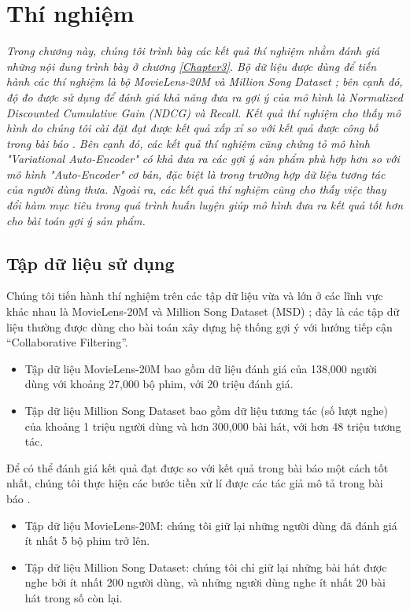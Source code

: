 \chapter{Thí nghiệm}

\setlength{\parindent}{6.5ex}
\label{Chapter4}
\graphicspath{{Chapter4/Chapter4Figs}}
\textit{Trong chương này, chúng tôi trình bày các kết quả thí nghiệm nhằm đánh giá những nội dung trình bày ở chương \ref{Chapter3}. Bộ dữ liệu được dùng để tiến hành các thí nghiệm là bộ MovieLens-20M \cite{Ml20M} và Million Song Dataset \cite{MSD}; bên cạnh đó, độ đo được sử dụng để đánh giá khả năng đưa ra gợi ý của mô hình là Normalized Discounted Cumulative Gain (NDCG) và  Recall. Kết quả thí nghiệm cho thấy mô hình do chúng tôi cài đặt đạt được kết quả xấp xỉ so với kết quả được công bố trong bài báo \cite{mvae}. Bên cạnh đó, các kết quả thí nghiệm cũng chứng tỏ mô hình "Variational Auto-Encoder" có khả đưa ra các gợi ý sản phẩm phù hợp hơn so với mô hình "Auto-Encoder" cơ bản, đặc biệt là trong trường hợp dữ liệu tương tác của người dùng thưa. Ngoài ra, các kết quả thí nghiệm cũng cho thấy việc thay đổi hàm mục tiêu trong quá trình huấn luyện giúp mô hình đưa ra kết quả tốt hơn cho bài toán gợi ý sản phẩm.}


\section{Tập dữ liệu sử dụng}
\label{chap4sec1}
Chúng tôi tiến hành thí nghiệm trên các tập dữ liệu vừa và lớn ở các lĩnh vực khác nhau là MovieLens-20M \cite{Ml20M} 
và Million Song Dataset (MSD) \cite{MSD}; đây là các tập dữ liệu thường được dùng cho bài toán xây dựng hệ thống gợi ý
với hướng tiếp cận ``Collaborative Filtering''. 
\begin{itemize}
    \item Tập dữ liệu MovieLens-20M bao gồm dữ liệu đánh giá của 138,000 người dùng với khoảng 27,000 bộ phim,
    với 20 triệu đánh giá.
    \item Tập dữ liệu Million Song Dataset bao gồm dữ liệu tương tác (số lượt nghe) của khoảng 1 triệu người dùng và hơn 300,000 bài hát, với hơn 48 triệu tương tác.
\end{itemize}

Để có thể đánh giá kết quả đạt được so với kết quả trong bài báo \cite{mvae} một cách tốt nhất,
chúng tôi thực hiện các bước tiền xử lí được các tác giả mô tả trong bài báo \cite{mvae}.
\begin{itemize}
    \item Tập dữ liệu MovieLens-20M: chúng tôi giữ lại những người dùng đã đánh giá ít nhất 5 bộ phim trở lên. 
    \item Tập dữ liệu Million Song Dataset: chúng tôi chỉ giữ lại những bài hát được nghe bởi ít nhất 200 người dùng, và những người dùng nghe ít nhất 20 bài hát trong số còn lại.
\end{itemize}

